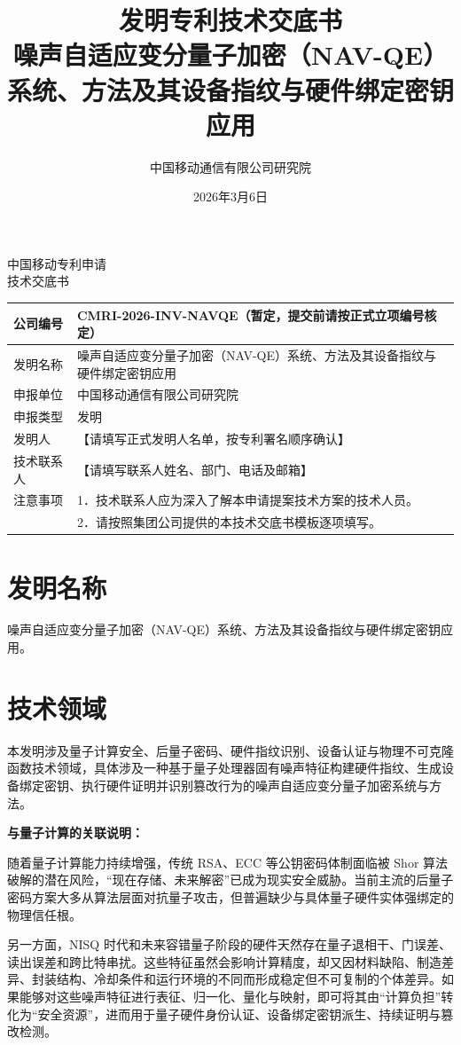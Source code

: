 \documentclass[12pt,a4paper]{article}
\title{\textbf{发明专利技术交底书} \\[0.5em]
    \Large 噪声自适应变分量子加密（NAV-QE）系统、方法及其设备指纹与硬件绑定密钥应用}
\author{中国移动通信有限公司研究院}
\date{2026年3月6日}
\begin{document}
\begin{center}
    {\Large\heiti 中国移动专利申请} \\[1em]
    {\Huge\heiti 技术交底书} \\[1em]
\end{center}

\noindent
\begin{tabular}{|p{3cm}|p{12cm}|}
\hline
公司编号 & CMRI-2026-INV-NAVQE（暂定，提交前请按正式立项编号核定） \\
\hline
发明名称 & 噪声自适应变分量子加密（NAV-QE）系统、方法及其设备指纹与硬件绑定密钥应用 \\
\hline
申报单位 & 中国移动通信有限公司研究院 \\
\hline
申报类型 & 发明 \\
\hline
发明人 & 【请填写正式发明人名单，按专利署名顺序确认】 \\
\hline
技术联系人 & 【请填写联系人姓名、部门、电话及邮箱】 \\
\hline
注意事项 & 1．技术联系人应为深入了解本申请提案技术方案的技术人员。 \\
         & 2．请按照集团公司提供的本技术交底书模板逐项填写。 \\
\hline
\end{tabular}

\vspace{1cm}

\section{发明名称}

噪声自适应变分量子加密（NAV-QE）系统、方法及其设备指纹与硬件绑定密钥应用。

\section{技术领域}

本发明涉及量子计算安全、后量子密码、硬件指纹识别、设备认证与物理不可克隆函数技术领域，具体涉及一种基于量子处理器固有噪声特征构建硬件指纹、生成设备绑定密钥、执行硬件证明并识别篡改行为的噪声自适应变分量子加密系统与方法。

\textbf{与量子计算的关联说明：}

随着量子计算能力持续增强，传统 RSA、ECC 等公钥密码体制面临被 Shor 算法破解的潜在风险，“现在存储、未来解密”已成为现实安全威胁。当前主流的后量子密码方案大多从算法层面对抗量子攻击，但普遍缺少与具体量子硬件实体强绑定的物理信任根。

另一方面，NISQ 时代和未来容错量子阶段的硬件天然存在量子退相干、门误差、读出误差和跨比特串扰。这些特征虽然会影响计算精度，却又因材料缺陷、制造差异、封装结构、冷却条件和运行环境的不同而形成稳定但不可复制的个体差异。如果能够对这些噪声特征进行表征、归一化、量化与映射，即可将其由“计算负担”转化为“安全资源”，进而用于量子硬件身份认证、设备绑定密钥派生、持续证明与篡改检测。
\end{document}
